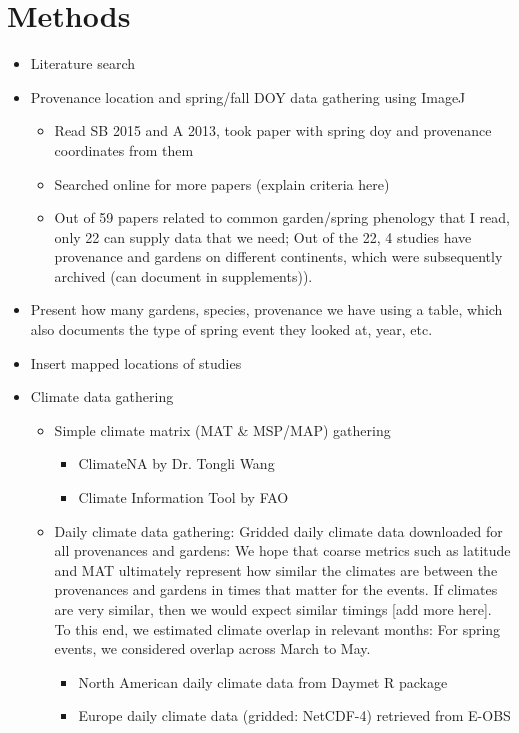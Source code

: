 \documentclass{article}
\begin{document}
\section{Methods}
\begin{itemize}
\item Literature search
\item Provenance location and spring/fall DOY data gathering using ImageJ
  \begin{itemize}
\item Read SB 2015 and A 2013, took paper with spring doy and provenance coordinates from them
\item Searched online for more papers (explain criteria here)
\item Out of 59 papers related to common garden/spring phenology that I read, only 22 can supply data that we need; Out of the 22, 4 studies have provenance and gardens on different continents, which were subsequently archived (can document in supplements)).
\end{itemize}
\item Present how many gardens, species, provenance we have using a table, which also documents the type of spring event they looked at, year, etc. 
\item Insert mapped locations of studies
\item Climate data gathering
  \begin{itemize}
  \item Simple climate matrix (MAT \& MSP/MAP) gathering
  \begin{itemize}
  \item ClimateNA by Dr. Tongli Wang
  \item Climate Information Tool by FAO
  \end{itemize}
  \item Daily climate data gathering: Gridded daily climate data downloaded for all provenances and gardens: We hope that coarse metrics such as latitude and MAT ultimately represent how similar the climates are between the provenances and gardens in times that matter for the events. If climates are very similar, then we would expect similar timings [add more here].
To this end, we estimated climate overlap in relevant months: For spring events, we considered overlap across March to May.
  \begin{itemize}
  \item North American daily climate data from Daymet R package
  \item Europe daily climate data (gridded: NetCDF-4) retrieved from E-OBS 

\end{itemize}
\end{itemize}
\end{itemize}
\end{document}
